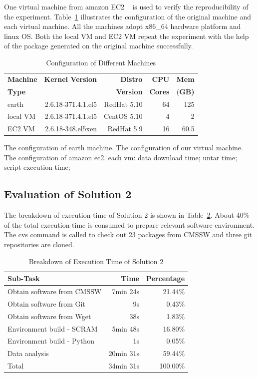 \documentclass{sig-alternate}
\begin{document}
One virtual machine from amazon EC2 ~\cite{amazon2010amazon} is used to verify the reproducibility of the experiment. Table~\ref{table:config-vm} illustrates the configuration of the original machine and each virtual machine. 
All the machines adopt x86\_64 hardware platform and linux OS.
Both the local VM and EC2 VM repeat the experiment with the help of the package generated on the original machine successfully.

\begin{table}
    \centering
    \begin{tabular}{|l|r|r|r|r|}
    \hline
    \bf Machine & \bf Kernel Version & \bf Distro & \bf CPU & \bf Mem\\ 
    \bf Type &  & \bf Version & \bf Cores & (\bf GB)\\ \hline
    earth  & 2.6.18-371.4.1.el5 & RedHat 5.10 & 64 & 125 \\ \hline 
    local VM& 2.6.18-371.4.1.el5 & CentOS 5.10 & 4 & 2 \\ \hline
    EC2 VM& 2.6.18-348.el5xen & RedHat 5.9 & 16 & 60.5 \\ \hline
    \end{tabular}
    \caption{Configuration of Different Machines}
    \label{table:config-vm}
\end{table}



The configuration of earth machine. The configuration of our virtual machine. The configuration of amazon ec2.
each vm: data download time; untar time; script execution time;

\subsection{Evaluation of Solution 2}
The breakdown of execution time of Solution 2 is shown in Table~\ref{table:time-2nd}. About 40\%  of the total execution time is consumed to prepare relevant software environment. The cvs command is called to check out 23 packages from CMSSW and three git repositories are cloned.

\begin{table}
    \centering
    \begin{tabular}{|l|r|r|}
    \hline
    \bf Sub-Task & \bf Time & \bf Percentage \\ \hline
    Obtain software from CMSSW & 7min 24s & 21.44\% \\ \hline
    Obtain software from Git & 9s & 0.43\% \\ \hline
    Obtain software from Wget & 38s & 1.83\% \\ \hline
    Environment build - SCRAM & 5min 48s & 16.80\% \\ \hline
    Environment build - Python & 1s & 0.05\% \\ \hline
    Data analysis & 20min 31s & 59.44\% \\ \hline
    Total & 34min 31s & 100.00\% \\ \hline
    \end{tabular}
    \caption{Breakdown of Execution Time of Solution 2}
    \label{table:time-2nd}
\end{table}
\end{document}
